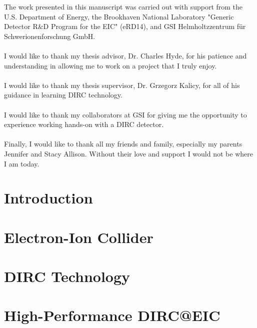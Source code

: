 \documentclass[12pt]{report}
\numberwithin{equation}{chapter}
\begin{document}
The work presented in this manuscript was carried out with support from the U.S. Department of Energy, the Brookhaven National Laboratory "Generic Detector R\&D Program for the EIC" (eRD14), and GSI Helmholtzzentrum f\"ur Schwerionenforschung GmbH.
\\~\\
I would like to thank my thesis advisor, Dr. Charles Hyde, for his patience  and understanding in allowing me to work on a project that I truly enjoy.
\\~\\
I would like to thank my thesis supervisor, Dr. Grzegorz Kalicy, for all of his guidance in learning DIRC technology. 
\\~\\
I would like to thank my collaborators at GSI for giving me the opportunity to experience working hands-on with a DIRC detector.
\\~\\
Finally, I would like to thank all my friends and family, especially my parents Jennifer and Stacy Allison. Without their love and support I would not be where I am today.

\afterpreface



\chapter{Introduction}

\chapter{Electron-Ion Collider}

\chapter{DIRC Technology}

\chapter{High-Performance DIRC@EIC}
\end{document}

